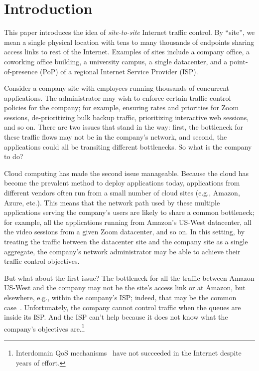 \section{Introduction}\label{s:intro}

This paper introduces the idea of {\em site-to-site} Internet traffic control. By ``site'', we mean a single physical location with tens to many thousands of endpoints sharing access links to rest of the Internet. Examples of sites include a company office, a coworking office building, a university campus, a single datacenter, and a point-of-presence (PoP) of a regional Internet Service Provider (ISP). 


Consider a company site with employees running thousands of concurrent applications. The administrator may wish to enforce certain traffic control policies for the company; for example, ensuring rates and priorities for Zoom sessions, de-prioritizing bulk backup traffic, prioritizing interactive web sessions, and so on. There are two issues that stand in the way: first, the bottleneck for these traffic flows may not be in the company's network, and second, the applications could all be transiting different bottlenecks. So what is the company to do?

Cloud computing has made the second issue manageable. Because the cloud has become the prevalent method to deploy applications today, applications from different vendors often run from a small number of cloud sites (e.g., Amazon, Azure, etc.). This means that the network path used by these multiple applications serving the company's users are likely to share a common bottleneck; for example, all the applications running from Amazon's US-West datacenter, all the video sessions from a given Zoom datacenter, and so on. In this setting,  by treating the traffic between the datacenter site and the company site as a single aggregate, the company's network administrator may be able to achieve their traffic control objectives.


But what about the first issue? The bottleneck for all the traffic between Amazon US-West and the company may not be the site's access link or at Amazon, but elsewhere, e.g., within the company's ISP; indeed, that may be the common case~\cite{inferring-interdomain-congestion, isp-throttle-1, isp-throttle-2, isp-throttle-3}. Unfortunately, the company cannot control traffic when the queues are inside its ISP. And the ISP can't help because it does not know what the company's objectives are.\footnote{Interdomain QoS mechanisms~\cite{braden1997resource, wroclawski1997use} have not succeeded in the Internet despite years of effort.}

